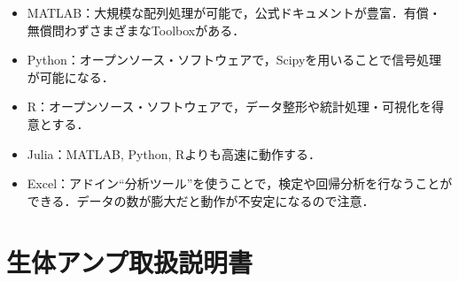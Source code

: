 \documentclass[a4j, twocolumn, openleft, uplatex, dvipdfmx]{jsbook}
\begin{document}
            \begin{itemize}
                \item \textsf{MATLAB}：大規模な配列処理が可能で，公式ドキュメントが豊富．有償・無償問わずさまざまなToolboxがある．
                \item \textsf{Python}：オープンソース・ソフトウェアで，Scipyを用いることで信号処理が可能になる．
                \item \textsf{R}：オープンソース・ソフトウェアで，データ整形や統計処理・可視化を得意とする．
                \item \textsf{Julia}：MATLAB, Python, Rよりも高速に動作する．
                \item \textsf{Excel}：アドイン``分析ツール''を使うことで，検定や回帰分析を行なうことができる．データの数が膨大だと動作が不安定になるので注意．
            \end{itemize}

    \clearpage
    \appendix
    \chapter{生体アンプ取扱説明書}
    
\end{document}
